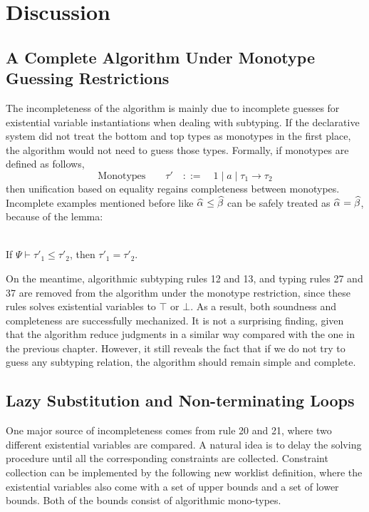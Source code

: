
\section{Discussion}


\subsection{A Complete Algorithm Under Monotype Guessing Restrictions}

The incompleteness of the algorithm is mainly due to incomplete guesses
for existential variable instantiations when dealing with subtyping.
If the declarative system did not treat the bottom and top types
as monotypes in the first place,
the algorithm would not need to guess those types.
Formally, if monotypes are defined as follows,
$$\text{Monotypes}\qquad \tau' \quad  ::= \quad 1 \mid a \mid \tau_1\to \tau_2$$
then unification based on equality regains completeness between monotypes.
Incomplete examples mentioned before like $\al \le \bt$ can be safely treated as $\al = \bt$,
because of the lemma:
\begin{lemma}~\\
    If $\Psi \vdash \tau'_1 \le \tau'_2$, then $\tau'_1 = \tau'_2$.
\end{lemma}

On the meantime, algorithmic subtyping rules 12 and 13, and typing rules 27 and 37
are removed from the algorithm under the monotype restriction,
since these rules solves existential variables to $\top$ or $\bot$.
As a result, both soundness and completeness are successfully mechanized.
It is not a surprising finding,
given that the algorithm reduce judgments in a similar way
compared with the one in the previous chapter.
However, it still reveals the fact that
if we do not try to guess any subtyping relation,
the algorithm should remain simple and complete.


\subsection{Lazy Substitution and Non-terminating Loops}

One major source of incompleteness comes from rule 20 and 21,
where two different existential variables are compared.
A natural idea is to delay the solving procedure until all the corresponding
constraints are collected.
Constraint collection can be implemented by the following new worklist definition,
where the existential variables also come with a set of upper bounds
and a set of lower bounds. Both of the bounds consist of algorithmic mono-types.

